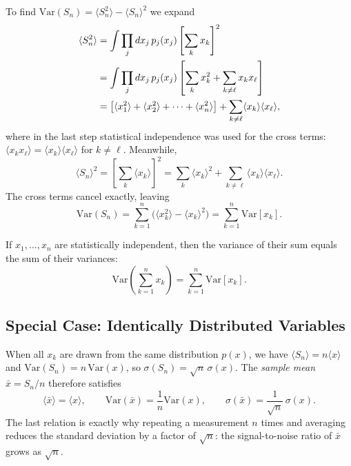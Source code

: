 To find $\mathrm{Var}(S_n) = \langle S_n^2\rangle - \langle S_n\rangle^2$ we expand
\begin{align}
    \langle S_n^2\rangle &= \int \prod_{j} dx_j\, p_j(x_j)\left[\sum_k x_k\right]^2 \notag \\
    &= \int \prod_{j} dx_j\, p_j(x_j)\left[\sum_k x_k^2 + \sum_{k \neq \ell} x_k x_\ell\right] \notag \\
    &= \left[\langle x_1^2\rangle + \langle x_2^2\rangle + \cdots + \langle x_n^2\rangle\right] + \sum_{k \neq \ell}\langle x_k\rangle\langle x_\ell\rangle,
\end{align}
where in the last step statistical independence was used for the cross terms: $\langle x_k x_\ell\rangle = \langle x_k\rangle\langle x_\ell\rangle$ for $k\neq\ell$. Meanwhile,
\begin{equation}
    \langle S_n\rangle^2 = \left[\sum_k \langle x_k\rangle\right]^2 = \sum_k \langle x_k\rangle^2 + \sum_{k\neq\ell}\langle x_k\rangle\langle x_\ell\rangle.
\end{equation}
The cross terms cancel exactly, leaving
\begin{equation}
    \mathrm{Var}(S_n) = \sum_{k=1}^{n}\bigl(\langle x_k^2\rangle - \langle x_k\rangle^2\bigr) = \sum_{k=1}^{n}\mathrm{Var}[x_k].
\end{equation}

\begin{theorem}
If $x_1, \ldots, x_n$ are statistically independent, then the variance of their sum equals the sum of their variances:
\begin{equation}
    \mathrm{Var}\!\left(\sum_{k=1}^{n} x_k\right) = \sum_{k=1}^{n} \mathrm{Var}[x_k].
\end{equation}
\end{theorem}

\subsection{Special Case: Identically Distributed Variables}

When all $x_k$ are drawn from the same distribution $p(x)$, we have $\langle S_n\rangle = n\langle x\rangle$ and $\mathrm{Var}(S_n) = n\,\mathrm{Var}(x)$, so $\sigma(S_n) = \sqrt{n}\,\sigma(x)$. The \emph{sample mean} $\bar{x} = S_n/n$ therefore satisfies
\begin{equation}
    \langle\bar{x}\rangle = \langle x\rangle, \qquad \mathrm{Var}(\bar{x}) = \frac{1}{n}\mathrm{Var}(x), \qquad \sigma(\bar{x}) = \frac{1}{\sqrt{n}}\,\sigma(x).
\end{equation}
The last relation is exactly why repeating a measurement $n$ times and averaging reduces the standard deviation by a factor of $\sqrt{n}$: the signal-to-noise ratio of $\bar{x}$ grows as $\sqrt{n}$.

